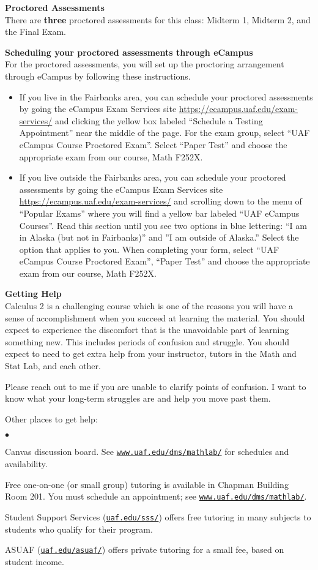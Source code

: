 \documentclass[12pt]{article}
\renewcommand{\emph}[1]{\textsf{\textbf{#1}}}
\newcommand{\localhead}[1]{\par\smallskip\textbf{#1} \smallskip\nobreak\\}%
\def\heading#1{\localhead{\large\emph{#1}}}
\newenvironment{clist}%
{\bgroup\parskip 0pt\begin{list}{$\bullet$}{\partopsep 4pt\topsep 0pt\itemsep -2pt}}%
{\end{list}\egroup}%
\begin{document}
\heading{Proctored Assessments}
There are \emph{three} proctored assessments for this class:
Midterm 1, Midterm 2, and the Final Exam. 

\heading{Scheduling your proctored assessments through eCampus}
For the proctored assessments, you will set up the proctoring arrangement through eCampus by following these instructions.
\begin{itemize}
\item If you live in the Fairbanks area, you can schedule your proctored assessments by going
the eCampus Exam Services site \href{https://ecampus.uaf.edu/exam-services/}{https://ecampus.uaf.edu/exam-services/} and clicking
the yellow box labeled “Schedule a Testing Appointment” near the middle of the page.
For the exam group, select “UAF eCampus Course Proctored Exam”. Select “Paper Test”
and choose the appropriate exam from our course, Math F252X.
\item If you live outside the Fairbanks area, you can schedule your proctored assessments by
going the eCampus Exam Services site \href{https://ecampus.uaf.edu/exam-services/}{https://ecampus.uaf.edu/exam-services/} and
scrolling down to the menu of “Popular Exams” where you will find a yellow bar labeled
“UAF eCampus Courses”. Read this section until you see two options in blue lettering: “I
am in Alaska (but not in Fairbanks)” and ”I am outside of Alaska.” Select the option that
applies to you. When completing your form, select “UAF eCampus Course Proctored
Exam”, “Paper Test” and choose the appropriate exam from our course, Math F252X.
\end{itemize}
\heading{Getting Help}
Calculus 2 is a challenging course which is one of the reasons you will have a sense of accomplishment when you succeed at learning the material. You should expect to experience the discomfort that is the unavoidable part of learning something new. This includes periods of confusion and struggle. You should expect to need to get extra help from your instructor, tutors in the Math and Stat Lab, and each other. 

Please reach out to me if you are unable to clarify points of confusion. I want to know what your long-term struggles are and help you move past them.

Other places to get help: 

\begin{clist}
	\item Canvas discussion board.
	See 
	\href{http://www.uaf.edu/dms/mathlab/}{\texttt{www.uaf.edu/dms/mathlab/}} for schedules and availability.
	\item Free
one-on-one (or small group) tutoring is available in 
Chapman Building Room 201. You must schedule an
appointment; see \href{http://www.uaf.edu/dms/mathlab/}{\texttt{www.uaf.edu/dms/mathlab/}}.
	\item Student Support Services (\href{https://uaf.edu/sss/}{\texttt{uaf.edu/sss/}}) offers free tutoring in many subjects to students who qualify for their program.
	\item ASUAF (\href{https://uaf.edu/asuaf/}{\texttt{uaf.edu/asuaf/}}) offers private tutoring for a small fee, based on student income.
\end{clist}
\end{document}
